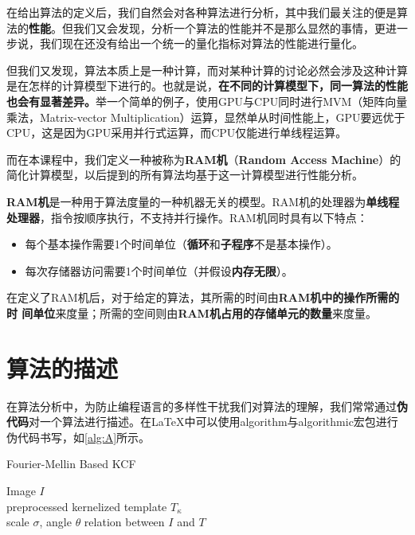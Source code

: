\documentclass[12pt,a4paper,violet]{bbe}
\begin{document}
在给出算法的定义后，我们自然会对各种算法进行分析，其中我们最关注的便是算法的\textbf{性能}。但我们又会发现，分析一个算法的性能并不是那么显然的事情，更进一步说，我们现在还没有给出一个统一的量化指标对算法的性能进行量化。

但我们又发现，算法本质上是一种计算，而对某种计算的讨论必然会涉及这种计算是在怎样的计算模型下进行的。也就是说，\textbf{在不同的计算模型下，同一算法的性能也会有显著差异。}举一个简单的例子，使用GPU与CPU同时进行MVM（矩阵向量乘法，Matrix-vector Multiplication）运算，显然单从时间性能上，GPU要远优于CPU，这是因为GPU采用并行式运算，而CPU仅能进行单线程运算。

而在本课程中，我们定义一种被称为\textbf{RAM机}（\textbf{Random Access Machine}）的简化计算模型，以后提到的所有算法均基于这一计算模型进行性能分析。
\begin{definition}
	\textbf{RAM机}是一种用于算法度量的一种机器无关的模型。RAM机的处理器为\textbf{单线程处理器}，指令按顺序执行，不支持并行操作。RAM机同时具有以下特点：
	\begin{itemize}
		\item 每个基本操作需要1个时间单位（\textbf{循环}和\textbf{子程序}不是基本操作）。
		\item 每次存储器访问需要1个时间单位（并假设\textbf{内存无限}）。
	\end{itemize}
\end{definition}

在定义了RAM机后，对于给定的算法，其所需的时间由\textbf{RAM机中的操作所需的时
间单位}来度量；所需的空间则由\textbf{RAM机占用的存储单元的数量}来度量。
\section{算法的描述}
在算法分析中，为防止编程语言的多样性干扰我们对算法的理解，我们常常通过\textbf{伪代码}对一个算法进行描述。在\LaTeX 中可以使用algorithm与algorithmic宏包进行伪代码书写，如\cref{alg:A}所示。
\begin{algorithm}  
	\caption{Fourier-Mellin Based KCF}  
	\label{alg:A}  
	\hspace*{0.02in}{\bf Input:}
	Image $I$\\preprocessed kernelized template $T_\kappa$\\
	\hspace*{0.02in}{\bf Output:} 
	scale $\sigma$, angle $\theta$ relation between $I$ and $T$ 
	
	\begin{algorithmic}[1] 
	\end{algorithmic}  
\end{algorithm}
\end{document}

